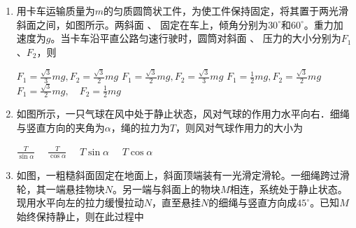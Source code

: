 \begin{enumerate}
\item 
{}
用卡车运输质量为$ m $的匀质圆筒状工件，为使工件保持固定，将其置于两光滑斜面之间，如图所示。两斜面  、  固定在车上，倾角分别为$ 30 ^{ \circ } $和$ 60 ^{ \circ } $。重力加速度为$ g $。当卡车沿平直公路匀速行驶时，圆筒对斜面  、  压力的大小分别为$ F_{1} $、$ F_{2} $，则  
\begin{figure}[h!]
\centering

\end{figure}

\fourchoices
{$ F _ { 1 } = \frac { \sqrt { 3 } } { 3 } m g , F _ { 2 } = \frac { \sqrt { 3 } } { 2 } m g $}
{$ F _ { 1 } = \frac { \sqrt { 3 } } { 2 } m g , F _ { 2 } = \frac { \sqrt { 3 } } { 3 } m g $}
{$ F _ { 1 } = \frac { 1 } { 2 } m g , F _ { 2 } = \frac { \sqrt { 3 } } { 2 } m g $}
{$ F _ { 1 } = \frac { \sqrt { 3 } } { 2 } m g , \quad F _ { 2 } = \frac { 1 } { 2 } m g $}

\item 
{}
如图所示，一只气球在风中处于静止状态，风对气球的作用力水平向右．细绳与竖直方向的夹角为$ \alpha $，绳的拉力为$ T $，则风对气球作用力的大小为  


\begin{minipage}[h!]{0.7\linewidth}
\vspace{0.3em}
\fourchoices
{$\frac { T } { \sin \alpha } \quad$}
{$\frac { T } { \cos \alpha } \quad$}
{$T \sin \alpha \quad$}
{$T \cos \alpha$}

\vspace{0.3em}
\end{minipage}
\hfill
\begin{minipage}[h!]{0.3\linewidth}
\flushright
\vspace{0.3em}

\vspace{0.3em}
\end{minipage}


\item 
{}
如图，一粗糙斜面固定在地面上，斜面顶端装有一光滑定滑轮。一细绳跨过滑轮，其一端悬挂物块$ N $。另一端与斜面上的物块$ M $相连，系统处于静止状态。现用水平向左的拉力缓慢拉动$ N $，直至悬挂$ N $的细绳与竖直方向成$ 45 ^{ \circ } $。已知$ M $始终保持静止，则在此过程中  
\begin{figure}[h!]
\centering

\end{figure}




\end{enumerate}
